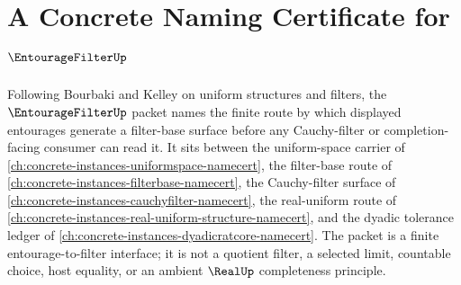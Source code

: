\chapter{A Concrete Naming Certificate for $\EntourageFilterUp$}
\label{ch:concrete-instances-entourage-filter-namecert}

Following Bourbaki and Kelley on uniform structures and filters, the $\EntourageFilterUp$ packet names the finite route by which displayed entourages generate a filter-base surface before any Cauchy-filter or completion-facing consumer can read it. It sits between the uniform-space carrier of \autoref{ch:concrete-instances-uniformspace-namecert}, the filter-base route of \autoref{ch:concrete-instances-filterbase-namecert}, the Cauchy-filter surface of \autoref{ch:concrete-instances-cauchyfilter-namecert}, the real-uniform route of \autoref{ch:concrete-instances-real-uniform-structure-namecert}, and the dyadic tolerance ledger of \autoref{ch:concrete-instances-dyadicratcore-namecert}. The packet is a finite entourage-to-filter interface; it is not a quotient filter, a selected limit, countable choice, host equality, or an ambient $\RealUp$ completeness principle.

